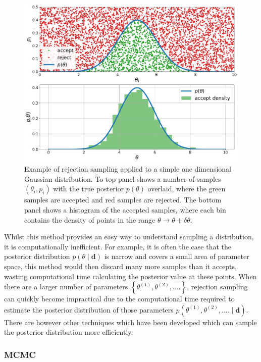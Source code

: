 %
\begin{figure}[ht]
	\centering
	\includegraphics[width=0.8\linewidth]{C2_cw/reject_sample.pdf}
        \caption[Rejection sampling example]{Example of rejection sampling
applied to a simple one dimensional Gaussian distribution. To top panel shows a
number of samples $(\theta_i, p_i)$ with the true posterior $p(\theta)$
overlaid, where the green samples are accepted and red samples are rejected.
The bottom panel shows a histogram of the accepted samples, where each bin
contains the density of points in the range $\theta \rightarrow \theta + \delta
\theta$.} \label{cwinto:bayes:sampling:rejection}
\end{figure}
%

Whilst this method provides an easy way to understand sampling a distribution, it is computationally inefficient. For example, it is often the case that the posterior distribution $p(\theta \mid \bm{d})$ is narrow and covers a small area of parameter space, this method would then discard many more samples than it accepts, wasting computational time calculating the posterior value at these points. 
When there are a larger number of parameters $\left\{\theta^{(1)},\theta^{(2)}, ....\right\}$, rejection sampling can quickly become impractical due to the computational time required to estimate the posterior distribution of those parameters $p(\theta^{(1)},\theta^{(2)}, .... \mid \bm{d})$.
There are however other techniques which have been developed which can sample the posterior distribution more efficiently.

%
\subsubsection{MCMC}
%

